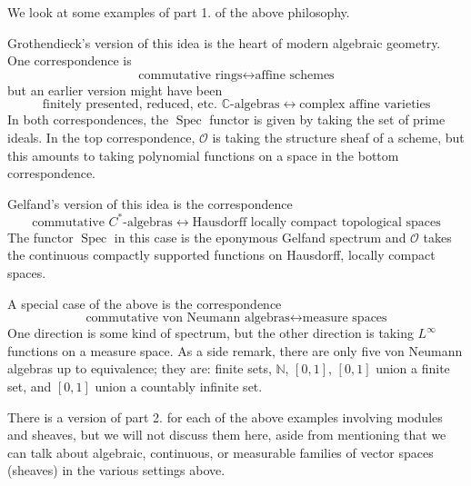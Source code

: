 \documentclass[11pt,leqno]{article}
\theoremstyle{plain}
\theoremstyle{definition}
\numberwithin{equation}{section}
\numberwithin{lem}{section}
\DeclareMathOperator{\Spec}{Spec}
\begin{document}
We look at some examples of part 1. of the above philosophy.

Grothendieck's version of this idea is the heart of modern algebraic geometry. One correspondence is 
\[\text{commutative rings}\longleftrightarrow\text{affine schemes}\]
but an earlier version might have been
\[\text{finitely presented, reduced, etc. $\mathbb C$-algebras}\longleftrightarrow\text{complex affine varieties}\]
In both correspondences, the $\Spec$ functor is given by taking the set of prime ideals. In the top correspondence, $\mathcal O$ is taking the structure sheaf of a scheme, but this amounts to taking polynomial functions on a space in the bottom correspondence.

Gelfand's version of this idea is the correspondence 
\[\text{commutative $C^\ast$-algebras}\longleftrightarrow\text{Hausdorff locally compact topological spaces}\]
The functor $\Spec$ in this case is the eponymous Gelfand spectrum and $\mathcal O$ takes the continuous compactly supported functions on Hausdorff, locally compact spaces.

A special case of the above is the correspondence 
\[\text{commutative von Neumann algebras}\longleftrightarrow\text{measure spaces}\]
One direction is some kind of spectrum, but the other direction is taking $L^\infty$ functions on a measure space. As a side remark, there are only five von Neumann algebras up to equivalence; they are: finite sets, $\mathbb N$, $[0,1]$, $[0,1]$ union a finite set, and $[0,1]$ union a countably infinite set.

There is a version of part 2. for each of the above examples involving modules and sheaves, but we will not discuss them here, aside from mentioning that we can talk about algebraic, continuous, or measurable families of vector spaces (sheaves) in the various settings above.
\end{document}
